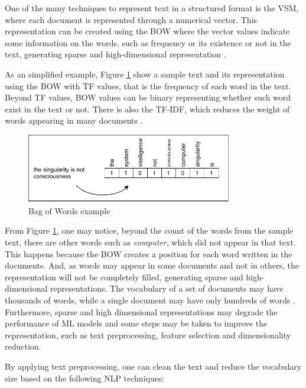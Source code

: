 One of the many techniques to represent text in a structured format is the
\gls{VSM}, where each document is represented through a numerical vector. This representation can be created using the \gls{BOW} where the vector values indicate some information on the words, such as frequency or its existence or not in the text, generating sparse and high-dimensional representation \cite{Aggarwal2013}.

As an simplified example, Figure \ref{fig:bow_example} show a sample text and its representation using the \gls{BOW} with \gls{TF} values, that is the frequency of each word in the text. Beyond \gls{TF} values, \gls{BOW} values can be binary  representing whether such word exist in the text or not. There is also the \gls{TF-IDF},  which reduces the weight of words appearing in many documents \cite{Aggarwal2018}.



\begin{figure}[htb]
    \centering
    \caption{Bag of Words example}
    \label{fig:bow_example}
    \includegraphics[width=0.8\textwidth]{images/chapters/BOW-TF.pdf}
\end{figure}

From Figure \ref{fig:bow_example}, one may notice, beyond the count of the words from the sample text, there are other words such as \textit{computer}, which did not appear in that text. This happens because the \gls{BOW} creates a position for each word written in the documents. And, as words may appear in some documents and not in others, the representation will not be completely filled, generating sparse and high-dimensional representations. The vocabulary of a set of documents may have thousands of words, while a single document may have only hundreds of words \cite{Witten2011}. Furthermore, sparse and high dimensional representations may degrade the performance of \gls{ML} models and some steps may be taken to improve the representation, such as text preprocessing,  feature selection and dimensionality reduction.

By applying text preprocessing,  one can clean the text and reduce the vocabulary size based on the following \gls{NLP} techniques:


